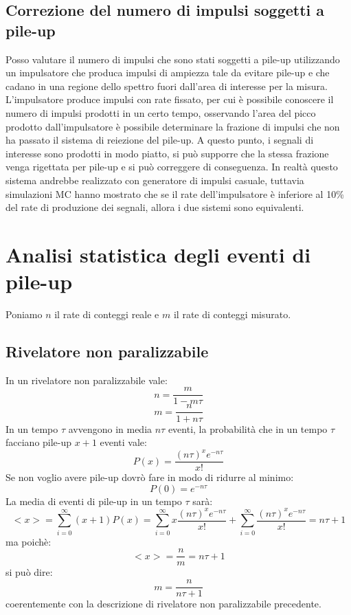 \subsection{Correzione del numero di impulsi soggetti a pile-up}
Posso valutare il numero di impulsi che sono stati soggetti a pile-up utilizzando un impulsatore che produca impulsi di ampiezza tale da evitare
pile-up e che cadano in una regione dello spettro fuori dall'area di interesse per la misura.
L'impulsatore produce impulsi con rate fissato, per cui \`e possibile conoscere il numero di impulsi prodotti in un certo tempo, osservando l'area
del picco prodotto dall'impulsatore \`e possibile determinare la frazione di impulsi che non ha passato il sistema di reiezione del pile-up.
A questo punto, i segnali di interesse sono prodotti in modo piatto, si pu\`o supporre che la stessa frazione venga rigettata per pile-up
e si pu\`o correggere di conseguenza.
In realt\`a questo sistema andrebbe realizzato con generatore di impulsi casuale, tuttavia simulazioni MC hanno mostrato che se il rate
dell'impulsatore \`e inferiore al 10\% del rate di produzione dei segnali, allora i due sistemi sono equivalenti.
\section{Analisi statistica degli eventi di pile-up}
Poniamo $n$ il rate di conteggi reale e $m$ il rate di conteggi misurato.
\subsection{Rivelatore non paralizzabile}
In un rivelatore non paralizzabile vale:
\begin{equation*}
n = \frac{m}{1-m\tau}
\end{equation*}
\begin{equation*}
m = \frac{n}{1+n\tau}
\end{equation*}
In un tempo $\tau$ avvengono in media $n\tau$ eventi, la probabilit\`a che in un tempo $\tau$ facciano pile-up $x+1$ eventi vale:
\begin{equation*}
P(x) = \frac{(n\tau)^x e^{-n\tau}}{x!}
\end{equation*}
Se non voglio avere pile-up dovr\`o fare in modo di ridurre al minimo:
\begin{equation*}
P(0) = e^{-n\tau}
\end{equation*}
La media di eventi di pile-up in un tempo $\tau$ sar\`a:
\begin{equation*}
<x> = \sum_{i=0}^{\infty}(x+1) P(x) =\sum_{i=0}^{\infty}x \frac{(n\tau)^x e^{-n\tau}}{x!} + \sum_{i=0}^{\infty} \frac{(n\tau)^x e^{-n\tau}}{x!} = n\tau +1
\end{equation*}
ma poich\`e:
\begin{equation*}
<x> = \frac{n}{m} = n\tau +1
\end{equation*}
si pu\`o dire:
\begin{equation*}
m = \frac{n}{n\tau + 1}
\end{equation*}
coerentemente con la descrizione di rivelatore non paralizzabile precedente.
